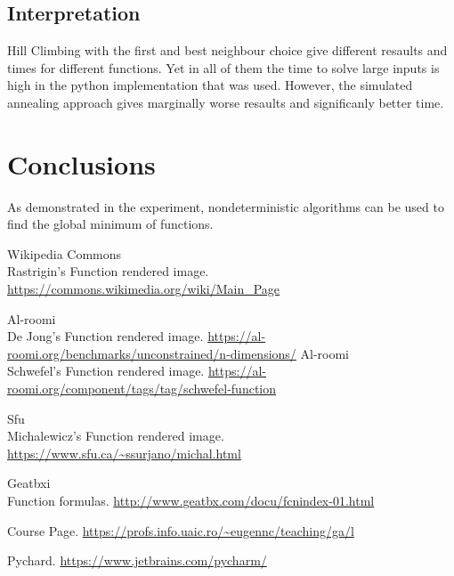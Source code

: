 \documentclass{report}
\begin{document}
\subsection{Interpretation}

 Hill Climbing with the first and best neighbour choice give different resaults and times for different functions. Yet in all of them the time to solve large inputs is high in the python implementation that was used.
However, the simulated annealing approach gives marginally worse resaults and significanly better time. 

\section{Conclusions}
As demonstrated in the experiment, nondeterministic algorithms can be used to find the global minimum of functions.


\begin{thebibliography}{9}

  Wikipedia Commons \\ Rastrigin's Function rendered image.
  \url{https://commons.wikimedia.org/wiki/Main_Page}

  Al-roomi  \\ De Jong's Function rendered image.
  \url{https://al-roomi.org/benchmarks/unconstrained/n-dimensions/}
  Al-roomi  \\ Schwefel's Function rendered image.
  \url{https://al-roomi.org/component/tags/tag/schwefel-function}

   Sfu \\ Michalewicz's Function rendered image.  
\url{https://www.sfu.ca/~ssurjano/michal.html}


  Geatbxi  \\ Function formulas.
  \url{http://www.geatbx.com/docu/fcnindex-01.html}

  Course Page.
  \url{https://profs.info.uaic.ro/~eugennc/teaching/ga/l}

  Pychard.
  \url{https://www.jetbrains.com/pycharm/}


\end{thebibliography}  
\end{document}

